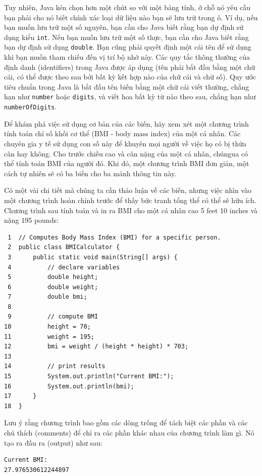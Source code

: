 Tuy nhiên, Java kén chọn hơn một chút so với một bảng tính, ở chỗ nó yêu
cầu bạn phải cho nó biết chính xác loại dữ liệu nào bạn sẽ lưu trữ trong
ô. Ví dụ, nếu bạn muốn lưu trữ một số nguyên, bạn cần cho Java biết rằng
bạn dự định sử dụng kiểu \texttt{int}. Nếu bạn muốn lưu trữ một số thực,
bạn cần cho Java biết rằng bạn dự định sử dụng \texttt{double}. Bạn cũng
phải quyết định một cái tên để sử dụng khi bạn muốn tham chiếu đến vị
trí bộ nhớ này. Các quy tắc thông thường của định danh (identifiers)
trong Java được áp dụng (tên phải bắt đầu bằng một chữ cái, có thể được
theo sau bởi bất kỳ kết hợp nào của chữ cái và chữ số). Quy ước tiêu
chuẩn trong Java là bắt đầu tên biến bằng một chữ cái viết thường, chẳng
hạn như \texttt{number} hoặc \texttt{digits}, và viết hoa bất kỳ từ nào
theo sau, chẳng hạn như \texttt{numberOfDigits}.

Để khám phá việc sử dụng cơ bản của các biến, hãy xem xét một chương
trình tính toán chỉ số khối cơ thể (BMI - body mass index) của một cá
nhân. Các chuyên gia y tế sử dụng con số này để khuyên mọi người về việc
họ có bị thừa cân hay không. Cho trước chiều cao và cân nặng của một cá
nhân, chúngua có thể tính toán BMI của người đó. Khi đó, một chương
trình BMI đơn giản, một cách tự nhiên sẽ có ba biến cho ba mảnh thông
tin này.

Có một vài chi tiết mà chúng ta cần thảo luận về các biến, nhưng việc
nhìn vào một chương trình hoàn chỉnh trước để thấy bức tranh tổng thể có
thể sẽ hữu ích. Chương trình sau tính toán và in ra BMI cho một cá nhân
cao 5 feet 10 inches và nặng 195 pounds:

\begin{verbatim}
 1  // Computes Body Mass Index (BMI) for a specific person.
 2  public class BMICalculator {
 3      public static void main(String[] args) {
 4          // declare variables
 5          double height;
 6          double weight;
 7          double bmi;
 8
 9          // compute BMI
10          height = 70;
11          weight = 195;
12          bmi = weight / (height * height) * 703;
13
14          // print results
15          System.out.println("Current BMI:");
16          System.out.println(bmi);
17      }
18  }
\end{verbatim}

Lưu ý rằng chương trình bao gồm các dòng trống để tách biệt các phần và
các chú thích (comments) để chỉ ra các phần khác nhau của chương trình
làm gì. Nó tạo ra đầu ra (output) như sau:

\begin{verbatim}
Current BMI: 
27.976530612244897
\end{verbatim}

